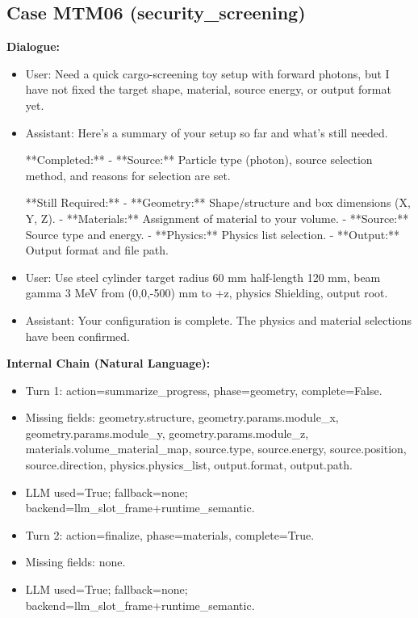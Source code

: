 \documentclass[11pt]{ctexart}
\begin{document}
\subsection{Case MTM06 (security\_screening)}
\textbf{Dialogue:}
\begin{itemize}
\item User: Need a quick cargo-screening toy setup with forward photons, but I have not fixed the target shape, material, source energy, or output format yet.
\item Assistant: Here's a summary of your setup so far and what's still needed.

**Completed:**
- **Source:** Particle type (photon), source selection method, and reasons for selection are set.

**Still Required:**
- **Geometry:** Shape/structure and box dimensions (X, Y, Z).
- **Materials:** Assignment of material to your volume.
- **Source:** Source type and energy.
- **Physics:** Physics list selection.
- **Output:** Output format and file path.
\item User: Use steel cylinder target radius 60 mm half-length 120 mm, beam gamma 3 MeV from (0,0,-500) mm to +z, physics Shielding, output root.
\item Assistant: Your configuration is complete. The physics and material selections have been confirmed.
\end{itemize}
\textbf{Internal Chain (Natural Language):}
\begin{itemize}
\item Turn 1: action=summarize\_progress, phase=geometry, complete=False.
\item Missing fields: geometry.structure, geometry.params.module\_x, geometry.params.module\_y, geometry.params.module\_z, materials.volume\_material\_map, source.type, source.energy, source.position, source.direction, physics.physics\_list, output.format, output.path.
\item LLM used=True; fallback=none; backend=llm\_slot\_frame+runtime\_semantic.
\item Turn 2: action=finalize, phase=materials, complete=True.
\item Missing fields: none.
\item LLM used=True; fallback=none; backend=llm\_slot\_frame+runtime\_semantic.
\end{itemize}
\end{document}
